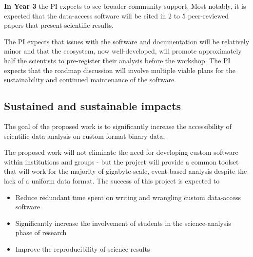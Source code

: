 \textbf{In Year 3}
the PI expects to see broader community support.  Most notably, it is expected that the data-access software will be cited in 2 to 5 peer-reviewed papers that present scientific results.

The PI expects that issues with the software and documentation will be relatively minor and that the ecosystem, now well-developed, will promote approximately half the scientists to pre-register their analysis before the workshop.  The PI expects that the roadmap discussion will involve multiple viable plans for the sustainability and continued maintenance of the software. 

\subsection{Sustained and sustainable impacts}

The goal of the proposed work is to significantly increase the accessibility of scientific data analysis on custom-format binary data.

The proposed work will not eliminate the need for developing custom software within institutions and groups - but the project will provide a common toolset that will work for the majority of gigabyte-scale, event-based analysis despite the lack of a uniform data format.  The success of this project is expected to

\begin{itemize}
    \item Reduce redundant time spent on writing and wrangling custom data-access software
    \item Significantly increase the involvement of students in the science-analysis phase of research
    \item Improve the reproducibility of science results 
\end{itemize}

